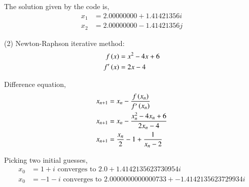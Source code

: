 \documentclass[journal]{IEEEtran}
\begin{document}
The solution given by the code is,
\begin{align}
    x_1 &= 2.00000000+1.41421356i \\
    x_2 &= 2.00000000-1.41421356j
\end{align}

(2) Newton-Raphson iterative method:
\begin{align}
    f\left(x\right) &= x^2 - 4x + 6 \\
    f^\prime\left(x\right) &= 2x - 4
\end{align}

Difference equation,
\begin{align}
    x_{n+1} &= x_n - \frac{f\left(x_{n}\right)}{f^\prime\left(x_n\right)} \\
    x_{n+1} &= x_n - \frac{x_n^2 - 4x_n + 6}{2x_n - 4} \\
    x_{n+1} &= \frac{x_n}{2} - 1 + \frac{1}{x_n - 2}
\end{align}

Picking two initial guesses,
\begin{align}
    x_0 &= 1+i \text{ converges to } 2.0 + 1.4142135623730954i \\
    x_0 &= -1-i \text{ converges to } 2.0000000000000733 + -1.4142135623729934i
\end{align}
\end{document}
